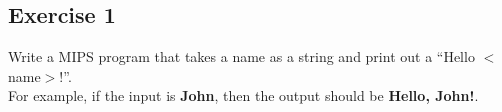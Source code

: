 \subsection{Exercise 1}
Write a MIPS program that takes a name as a string and print out a
``Hello $<$name$>$!''.\\
For example, if the input is \textbf{John}, then the output should be \textbf{Hello, John!}.

